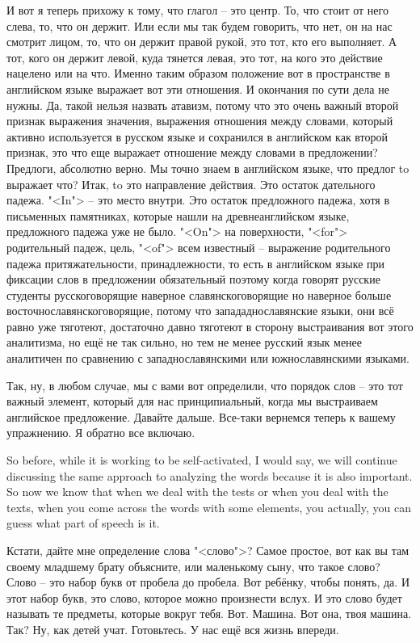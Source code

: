 \documentclass[main.tex]{subfiles}
\begin{document}
И вот я теперь прихожу к тому, что глагол -- это центр.
То, что стоит от него слева, то, что он держит.
Или если мы так будем говорить, что нет, он на нас смотрит лицом, то, что он держит правой рукой, это тот, кто его выполняет.
А тот, кого он держит левой, куда тянется левая, это тот, на кого это действие нацелено или на что.
Именно таким образом положение вот в пространстве в английском языке выражает вот эти отношения.
И окончания по сути дела не нужны.
Да, такой нельзя назвать атавизм, потому что это очень важный второй признак выражения значения, выражения отношения между словами, который активно используется в русском языке и сохранился в английском как второй признак, это что еще выражает отношение между словами в предложении?
Предлоги, абсолютно верно.
Мы точно знаем в английском языке, что предлог to выражает что? 
Итак, to это направление действия.
Это остаток дательного падежа.
"<In"> -- это место внутри.
Это остаток предложного падежа, хотя в письменных памятниках, которые нашли на древнеанглийском языке, предложного падежа уже не было.
"<On"> на поверхности, "<for"> родительный падеж, цель, "<of"> всем известный -- выражение родительного падежа притяжательности, принадлежности, то есть в английском языке при фиксации слов в предложении обязательный поэтому когда говорят русские студенты русскоговорящие наверное славянскоговорящие но наверное больше восточнославянскоговорящие, потому что запададнославянские языки, они всё равно уже тяготеют, достаточно давно тяготеют в сторону выстраивания вот этого аналитизма, но ещё не так сильно, но тем не менее русский язык менее аналитичен по сравнению с западнославянскими или южнославянскими языками.

Так, ну, в любом случае, мы с вами вот определили, что порядок слов -- это тот важный элемент, который для нас принципиальный, когда мы выстраиваем английское предложение.
Давайте дальше.
Все-таки вернемся теперь к вашему упражнению.
Я обратно все включаю.

So before, while it is working to be self-activated, I would say, we will continue discussing the same approach to analyzing the words because it is also important.
So now we know that when we deal with the tests or when you deal with the texts, when you come across the words with some elements, you actually, you can guess what part of speech is it.

Кстати, дайте мне определение слова "<слово">?
Самое простое, вот как вы там своему младшему брату объясните, или маленькому сыну, что такое слово?
Слово -- это набор букв от пробела до пробела.
Вот ребёнку, чтобы понять, да.
И этот набор букв, это слово, которое можно произнести вслух.
И это слово будет называть те предметы, которые вокруг тебя.
Вот.
Машина.
Вот она, твоя машина.
Так? Ну, как детей учат.
Готовьтесь. У нас ещё вся жизнь впереди.
\end{document}
